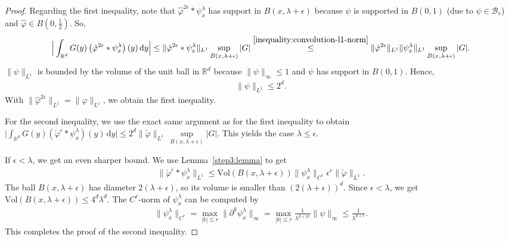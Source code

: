 \begin{proof}
    Regarding the first inequality, note that \(\hat \varphi^{2\epsilon} * \psi^\lambda_x\) has support in \(B(x, \lambda + \epsilon)\) because \(\psi\) is supported in \(B(0,1)\) (due to \(\psi \in \mathcal{B}_r\)) and \(\hat \varphi \in B(0, \frac{1}{2})\). So, 
    \begin{align*}
        \Big| \int_{\mathbb{R}^d} G(y) \left( \hat \varphi^{2\epsilon} * \psi^\lambda_x \right) (y) \, \mathrm{d}y \Big| \leq \lVert \hat \varphi^{2\epsilon} * \psi^\lambda_x \rVert_{L^1} \sup_{B(x, \lambda + \epsilon)}|G| \overset{\eqref{inequality:convolution-l1-norm}}{\leq} \lVert \hat \varphi^{2\epsilon} \rVert_{L^1} \lVert \psi^\lambda_x \rVert_{L^1} \sup_{B(x, \lambda + \epsilon)}|G|.
    \end{align*}
    \(\lVert \psi \rVert_{L^1}\) is bounded by the volume of the unit ball in \(\mathbb{R}^d\) because \(\lVert \psi \rVert_{\infty} \leq 1\) and \(\psi\) has support in \(B(0,1)\). Hence, 
    \begin{align}\label{bound-psi-l1}
        \lVert \psi \rVert_{L^1} \leq 2^d.
    \end{align}
    With \(\lVert \hat \varphi^{2\epsilon} \rVert_{L^1} = \lVert \hat \varphi\rVert_{L^1}\), we obtain the first inequality.

    For the second inequality, we use the exact same argument as for the first inequality to obtain \(\Big| \int_{\mathbb{R}^d} G(y) \left( \check \varphi^{\epsilon} * \psi^\lambda_x \right) (y) \, \mathrm{d}y \Big| \leq 2^d \lVert \check \varphi \rVert_{L^1} \,  \sup\limits_{B(x, \lambda + \epsilon)}|G|\). This yields the case \(\lambda \leq \epsilon\). 
    
    If \(\epsilon < \lambda\), we get an even sharper bound. We use Lemma~\ref{step3:lemma} to get  
    \begin{align*}
        \lVert \check \varphi^{\epsilon} * \psi^\lambda_x \rVert_{L^1} \leq \mathrm{Vol}(B(x, \lambda + \epsilon)) \lVert \psi^\lambda_x \rVert_{C^r} \epsilon^r \lVert \check \varphi \rVert_{L^1}.
    \end{align*}
    The ball \(B(x,\lambda  + \epsilon)\) has diameter \(2(\lambda + \epsilon)\), so its volume is smaller than \((2(\lambda + \epsilon))^d\). Since \(\epsilon < \lambda\), we get \(\mathrm{Vol}(B(x,\lambda  + \epsilon)) \leq 4^d \lambda^d\). The \(C^r\)-norm of \(\psi^\lambda_x\) can be computed by
    \begin{align*}
        \lVert \psi^\lambda_x \rVert_{C^r} = \max_{|k| \leq r} \lVert \partial^k \psi^\lambda_x \rVert_{\infty} =  \max_{|k| \leq r} \frac{1}{\lambda^{d + |k|}} \lVert \psi \rVert_{\infty} \leq \frac{1}{\lambda^{d + r}}.
    \end{align*}    
    This completes the proof of the second inequality.
\end{proof}

